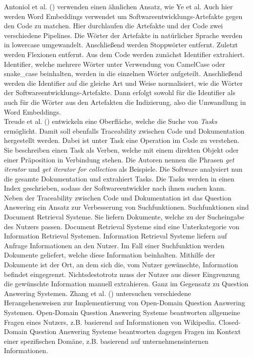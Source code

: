 Antoniol et al. (\citeyear{Antoniol_Canfora_Casazza_DeLucia_2000}) verwenden einen ähnlichen Ansatz, wie Ye et al.
Auch hier werden Word Embeddings verwendet um Softwareentwicklungs-Artefakte gegen den Code zu matchen.
Hier durchlaufen die Artefakte und der Code zwei verschiedene Pipelines.
Die Wörter der Artefakte in natürlicher Sprache werden in lowercase umgewandelt.
Anschließend werden Stoppwörter entfernt.
Zuletzt werden Flexionen entfernt.
Aus dem Code werden zunächst Identifier extrahiert.
Identifier, welche mehrere Wörter unter Verwendung von CamelCase oder snake\_case beinhalten, werden in die einzelnen Wörter aufgeteilt.
Anschließend werden die Identifier auf die gleiche Art und Weise normalisiert, wie die Wörter der Softwareentwicklungs-Artefakte.
Dann erfolgt sowohl für die Identifier als auch für die Wörter aus den Artefakten die Indizierung, also die Umwandlung in Word Embeddings.\\

Treude et al. (\citeyear{Treude_Sicard_Klocke_Robillard_2015}) entwickeln eine Oberfläche, welche die Suche von \textit{Tasks} ermöglicht.
Damit soll ebenfalls Traceability zwischen Code und Dokumentation hergestellt werden.
Dabei ist unter Task eine Operation im Code zu verstehen.
Sie beschreiben einen Task als Verben, welche mit einem direkten Objekt oder einer Präposition in Verbindung stehen.
Die Autoren nennen die Phrasen \textit{get iterator} und \textit{get iterator for collection} als Beispiele.
Die Software analysiert nun die gesamte Dokumentation und extrahiert Tasks.
Die Tasks werden in einen Index geschrieben, sodass der Softwareentwickler nach ihnen suchen kann.\\

Neben der Traceability zwischen Code und Dokumentation ist das Question Answering ein Ansatz zur Verbesserung von Suchfunktionen.
Suchfunktionen sind Document Retrieval Systeme.
Sie liefern Dokumente, welche zu der Sucheingabe des Nutzers passen.
Document Retrieval Systeme sind eine Unterkategorie von Information Retrieval Systemen.
Information Retrieval Systeme liefern auf Anfrage Informationen an den Nutzer.
Im Fall einer Suchfunktion werden Dokumente geliefert, welche diese Information beinhalten.
Mithilfe der Dokumente ist der Ort, an dem sich die, vom Nutzer gewünschte, Information befindet eingegrenzt.
Nichtsdestotrotz muss der Nutzer aus dieser Eingrenzung die gewünschte Information manuell extrahieren.
Ganz im Gegensatz zu Question Answering Systemen.
Zhang et al. (\citeyear{Zhang_Chen_Xu_Cao_Chen_Cohn_Fang_2023}) untersuchen verschiedene Herangehensweisen zur Implementierung von Open-Domain Question Answering Systemen.
Open-Domain Question Answering Systeme beantworten allgemeine Fragen eines Nutzers, z.B. basierend auf Informationen von Wikipedia.
Closed-Domain Question Answering Systeme beantworten dagegen Fragen im Kontext einer spezifischen Domäne, z.B. basierend auf unternehmensinternen Informationen.\\

